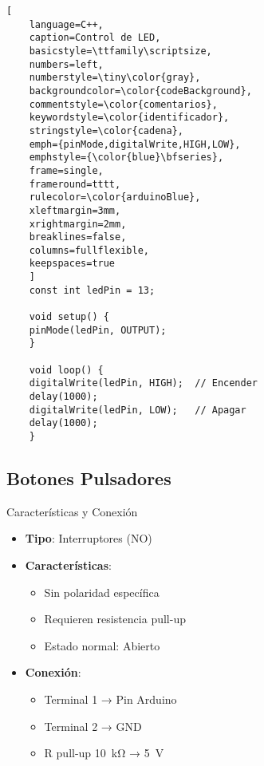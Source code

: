 \begin{lstlisting}[
	language=C++,
	caption=Control de LED,
	basicstyle=\ttfamily\scriptsize,
	numbers=left,
	numberstyle=\tiny\color{gray},
	backgroundcolor=\color{codeBackground},
	commentstyle=\color{comentarios},
	keywordstyle=\color{identificador},
	stringstyle=\color{cadena},
	emph={pinMode,digitalWrite,HIGH,LOW},
	emphstyle={\color{blue}\bfseries},
	frame=single,
	frameround=tttt,
	rulecolor=\color{arduinoBlue},
	xleftmargin=3mm,
	xrightmargin=2mm,
	breaklines=false,
	columns=fullflexible,
	keepspaces=true
	]
	const int ledPin = 13;
	
	void setup() {
	pinMode(ledPin, OUTPUT);
	}
	
	void loop() {
	digitalWrite(ledPin, HIGH);  // Encender
	delay(1000);
	digitalWrite(ledPin, LOW);   // Apagar
	delay(1000);
	}
\end{lstlisting}

\subsection{Botones Pulsadores}
\begin{componentBox}{Características y Conexión \citep{scherz2016practical}}
	\begin{itemize}[leftmargin=*,itemsep=1pt,parsep=1pt]
		\item \textbf{Tipo}: Interruptores (NO)
		\item \textbf{Características}:
		\begin{itemize}[itemsep=0pt,parsep=0pt]
			\item Sin polaridad específica
			\item Requieren resistencia pull-up
			\item Estado normal: Abierto
		\end{itemize}
		\item \textbf{Conexión}:
		\begin{itemize}[itemsep=0pt,parsep=0pt]
			\item Terminal 1 → Pin Arduino
			\item Terminal 2 → GND
			\item R pull-up \SI{10}{\kilo\ohm} → \SI{5}{\volt}
		\end{itemize}
	\end{itemize}
\end{componentBox}

